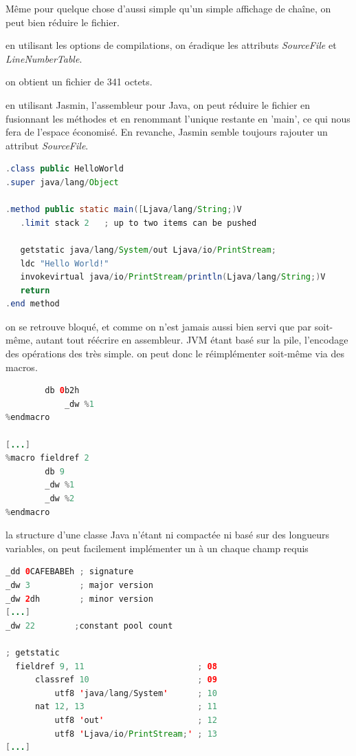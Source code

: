 Même pour quelque chose d'aussi simple qu'un simple affichage de chaîne, on peut bien réduire le fichier.

en utilisant les options de compilations, on éradique les attributs {\em SourceFile} et {\em LineNumberTable}.

on obtient un fichier de 341 octets.

en utilisant Jasmin, l'assembleur pour Java, on peut réduire le fichier en fusionnant les méthodes et en renommant l'unique restante en 'main', ce qui nous fera de l'espace économisé. En revanche, Jasmin semble toujours rajouter un attribut {\em SourceFile}.

\begin{lstlisting}[language={java},caption={un Hello World minimal en Jasmin},label={lst:albertini:hwjasmin}]
.class public HelloWorld
.super java/lang/Object

.method public static main([Ljava/lang/String;)V
   .limit stack 2   ; up to two items can be pushed

   getstatic java/lang/System/out Ljava/io/PrintStream;
   ldc "Hello World!"
   invokevirtual java/io/PrintStream/println(Ljava/lang/String;)V
   return
.end method
\end{lstlisting}

on se retrouve bloqué, et comme on n'est jamais aussi bien servi que par soit-même, autant tout réécrire en assembleur.
JVM étant basé sur la pile, l'encodage des opérations des très simple. on peut donc le réimplémenter soit-même via des macros.
\begin{lstlisting}[language={java},caption={un Hello World minimal en Java},label={lst:albertini:asmjavamacros}]
%macro GETSTATIC 1
        db 0b2h
            _dw %1
%endmacro

[...]
%macro fieldref 2
        db 9
        _dw %1
        _dw %2
%endmacro
\end{lstlisting}

la structure d'une classe Java n'étant ni compactée ni basé sur des longueurs variables, on peut facilement implémenter un à un chaque champ requis
\begin{lstlisting}[language={java},caption={un Hello World minimal en Java},label={lst:albertini:asmjavafields}]
_dd 0CAFEBABEh ; signature
_dw 3          ; major version
_dw 2dh        ; minor version
[...]
_dw 22        ;constant pool count

; getstatic
  fieldref 9, 11                       ; 08
      classref 10                      ; 09
          utf8 'java/lang/System'      ; 10
      nat 12, 13                       ; 11
          utf8 'out'                   ; 12
          utf8 'Ljava/io/PrintStream;' ; 13
[...]
\end{lstlisting}

